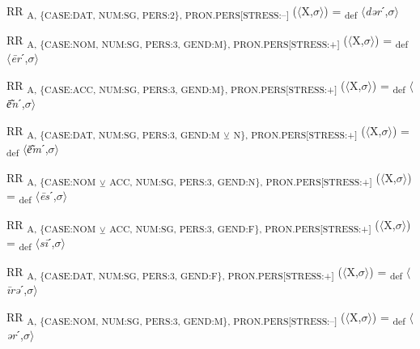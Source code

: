 {\begin{exe}
 RR \textsubscript{A, \{CASE:DAT, NUM:SG, PERS:2\}, PRON.PERS[STRESS:–]} ($\langle$X,$\sigma $$\rangle$) = \textsubscript{def} $\langle$\textit{dər}ˊ,$\sigma $$\rangle$
\end{exe}

\begin{exe}
 RR \textsubscript{A, \{CASE:NOM, NUM:SG, PERS:3, GEND:M\}, PRON.PERS[STRESS:+]} ($\langle$X,$\sigma $$\rangle$) = \textsubscript{def} $\langle$\textit{\=er}ˊ,$\sigma $$\rangle$
\end{exe}

\begin{exe}
 RR \textsubscript{A, \{CASE:ACC, NUM:SG, PERS:3, GEND:M\}, PRON.PERS[STRESS:+]} ($\langle$X,$\sigma $$\rangle$) = \textsubscript{def} $\langle$\textit{\=e͂n}ˊ,$\sigma $$\rangle$
\end{exe}

\begin{exe}
 RR \textsubscript{A, \{CASE:DAT, NUM:SG, PERS:3, GEND:M} \textsubscript{${\veebar}$}\textsubscript{ N\}, PRON.PERS[STRESS:+]} ($\langle$X,$\sigma $$\rangle$) = \textsubscript{def} $\langle$\textit{\=e͂m}ˊ,$\sigma $$\rangle$
\end{exe}

\begin{exe}
 RR \textsubscript{A, \{CASE:NOM} \textsubscript{${\veebar}$}\textsubscript{ ACC, NUM:SG, PERS:3, GEND:N\}, PRON.PERS[STRESS:+]} ($\langle$X,$\sigma $$\rangle$) = \textsubscript{def} $\langle$\textit{\=es}ˊ,$\sigma $$\rangle$
\end{exe}

\begin{exe}
 RR \textsubscript{A, \{CASE:NOM} \textsubscript{${\veebar}$}\textsubscript{ ACC, NUM:SG, PERS:3, GEND:F\}, PRON.PERS[STRESS:+]} ($\langle$X,$\sigma $$\rangle$) = \textsubscript{def} $\langle$\textit{s\=i}ˊ,$\sigma $$\rangle$
\end{exe}

\begin{exe}
 RR \textsubscript{A, \{CASE:DAT, NUM:SG, PERS:3, GEND:F\}, PRON.PERS[STRESS:+]} ($\langle$X,$\sigma $$\rangle$) = \textsubscript{def} $\langle$\textit{\=irə}ˊ,$\sigma $$\rangle$
\end{exe}

\begin{exe}
 RR \textsubscript{A, \{CASE:NOM, NUM:SG, PERS:3, GEND:M\}, PRON.PERS[STRESS:–]} ($\langle$X,$\sigma $$\rangle$) = \textsubscript{def} $\langle$\textit{ər}ˊ,$\sigma $$\rangle$
\end{exe}

}
